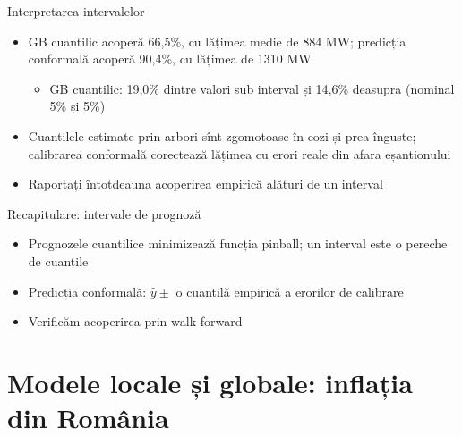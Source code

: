 \begin{frame}{Interpretarea intervalelor}
\itemsize{\small}
\begin{itemize}
    \item GB cuantilic acoperă 66{,}5\%, cu lățimea medie de 884 MW; predicția conformală acoperă 90{,}4\%, cu lățimea de 1310 MW
    \begin{itemize}
        \item GB cuantilic: 19{,}0\% dintre valori sub interval și 14{,}6\% deasupra (nominal 5\% și 5\%)
    \end{itemize}
    \item Cuantilele estimate prin arbori sînt zgomotoase în cozi și prea înguste; calibrarea conformală corectează lățimea cu erori reale din afara eșantionului
    \item Raportați întotdeauna acoperirea empirică alături de un interval
\end{itemize}
\end{frame}

\begin{frame}{Recapitulare: intervale de prognoză}
\itemsize{\small}
\begin{itemize}
    \item Prognozele cuantilice minimizează funcția pinball; un interval este o pereche de cuantile
    \item Predicția conformală: $\hat y \pm$ o cuantilă empirică a erorilor de calibrare
    \item Verificăm acoperirea prin walk-forward
\end{itemize}
\end{frame}


\section{Modele locale și globale: inflația din România}

